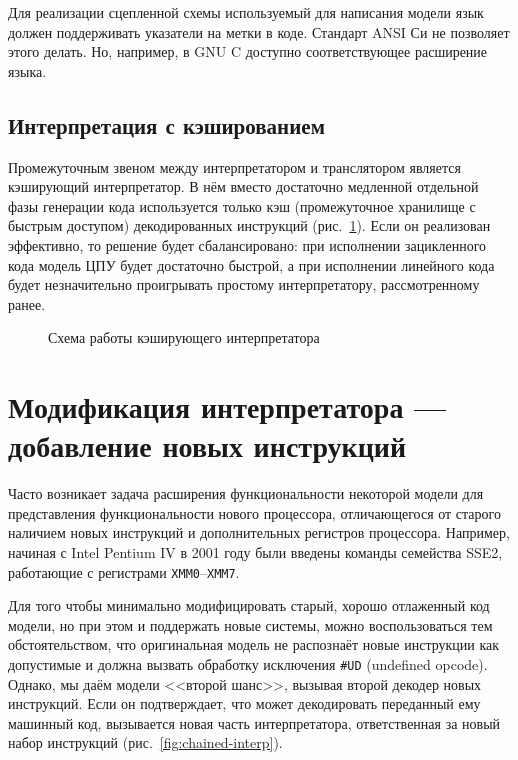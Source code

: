 Для реализации сцепленной схемы используемый для написания модели язык должен поддерживать указатели на метки в коде. Стандарт ANSI Си не позволяет этого делать. Но, например, в GNU C доступно соответствующее расширение языка.

\subsection{Интерпретация с кэшированием}

Промежуточным звеном между интерпретатором и транслятором является кэширующий интерпретатор. В нём вместо достаточно медленной отдельной фазы генерации кода используется только кэш (промежуточное хранилище с быстрым доступом) декодированных инструкций (рис.~\ref{fig:cached-interp}). Если он реализован эффективно, то решение будет сбалансировано: при исполнении зацикленного кода модель ЦПУ будет достаточно быстрой, а при исполнении линейного кода будет незначительно проигрывать простому интерпретатору, рассмотренному ранее.

\begin{figure}[htb]
    \centering
    \caption{Схема работы кэширующего интерпретатора}
    \label{fig:cached-interp}
\end{figure}

\section[Модификация интерпретатора]{Модификация интерпретатора --- добавление новых инструкций}

Часто возникает задача расширения функциональности некоторой модели для представления функциональности нового процессора, отличающегося от старого наличием новых инструкций и дополнительных регистров процессора. Например, начиная с Intel Pentium IV в 2001 году были введены команды семейства SSE2, работающие с регистрами \texttt{XMM0}--\texttt{XMM7}.

Для того чтобы минимально модифицировать старый, хорошо отлаженный код модели, но при этом и поддержать новые системы, можно воспользоваться тем обстоятельством, что оригинальная модель не распознаёт новые инструкции как допустимые и должна вызвать обработку исключения \texttt{\#UD} (\abbr undefined opcode). Однако, мы даём модели <<второй шанс>>, вызывая второй декодер новых инструкций. Если он подтверждает, что может декодировать переданный ему машинный код, вызывается новая часть интерпретатора, ответственная за новый набор инструкций (рис.~\ref{fig:chained-interp}). 

